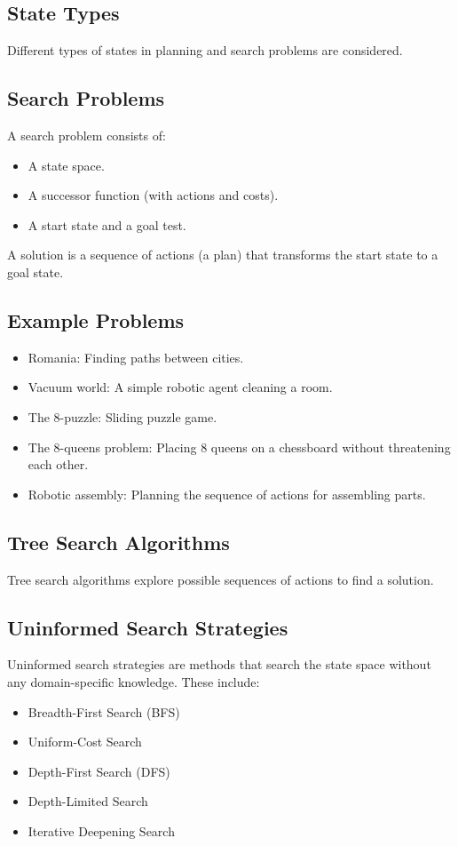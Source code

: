 \documentclass[8pt]{article}
\begin{document}
\subsection{State Types}
Different types of states in planning and search problems are considered.

\subsection{Search Problems}
A search problem consists of:
\begin{itemize}
    \item A state space.
    \item A successor function (with actions and costs).
    \item A start state and a goal test.
\end{itemize}
A solution is a sequence of actions (a plan) that transforms the start state to a goal state.

\subsection{Example Problems}
\begin{itemize}
    \item Romania: Finding paths between cities.
    \item Vacuum world: A simple robotic agent cleaning a room.
    \item The 8-puzzle: Sliding puzzle game.
    \item The 8-queens problem: Placing 8 queens on a chessboard without threatening each other.
    \item Robotic assembly: Planning the sequence of actions for assembling parts.
\end{itemize}

\subsection{Tree Search Algorithms}
Tree search algorithms explore possible sequences of actions to find a solution.

\subsection{Uninformed Search Strategies}
Uninformed search strategies are methods that search the state space without any domain-specific knowledge. These include:
\begin{itemize}
    \item Breadth-First Search (BFS)
    \item Uniform-Cost Search
    \item Depth-First Search (DFS)
    \item Depth-Limited Search
    \item Iterative Deepening Search
\end{itemize}
\end{document}
